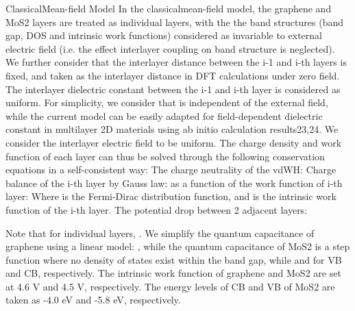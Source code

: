 ClassicalMean-field Model
In the classicalmean-field model, the graphene and MoS2 layers are treated as individual layers, with the the band structures (band gap, DOS and intrinsic work functions) considered as invariable to external electric field (i.e. the effect interlayer coupling on band structure is neglected). We further consider that the interlayer distance  between the i-1 and i-th layers is fixed, and taken as the interlayer distance in DFT calculations under zero field. The interlayer dielectric constant  between the i-1 and i-th layer is considered as uniform. For simplicity, we consider that  is independent of the external field, while the current model can be easily adapted for field-dependent dielectric constant in multilayer 2D materials using ab initio calculation results23,24. We consider the interlayer electric field   to be uniform. The charge density   and work function   of each layer can thus be solved through the following conservation equations in a self-consistent way:
	The charge neutrality of the vdWH:
	Charge balance of the i-th layer by Gauss law:
	 as a function of the work function  of i-th layer:
Where   is the Fermi-Dirac distribution function, and   is the intrinsic work function of the i-th layer. 
	The potential drop between 2 adjacent layers:

Note that for individual layers,   . We simplify the quantum capacitance of graphene using a linear model:  , while the quantum capacitance of MoS2 is a step function where no density of states exist within the band gap, while  and   for VB and CB, respectively. The intrinsic work function of graphene and MoS2 are set at 4.6 V and 4.5 V, respectively. The energy levels of CB and VB of MoS2 are taken as -4.0 eV and -5.8 eV, respectively.






